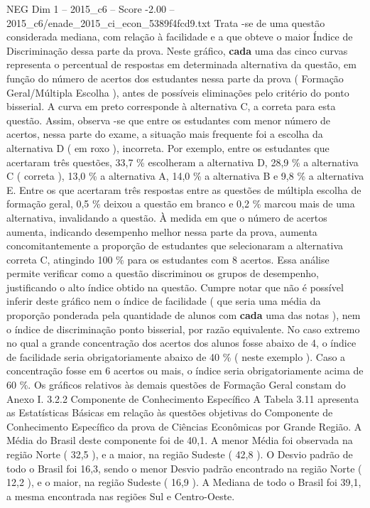 \begin{textsample}{NEG Dim 1 – 2015\_c6 – Score -2.00 – 2015\_c6/enade\_2015\_ci\_econ\_5389f4fcd9.txt}
Trata -se de uma questão considerada mediana, com relação à facilidade e a que obteve o maior Índice de Discriminação dessa parte da prova.
Neste gráfico, \textbf{cada} uma das cinco curvas representa o percentual de respostas em determinada alternativa da questão, em função do número de acertos dos estudantes nessa parte da prova ( Formação Geral/Múltipla Escolha ), antes de possíveis eliminações pelo critério do ponto bisserial.
A curva em preto corresponde à alternativa C, a correta para esta questão.
Assim, observa -se que entre os estudantes com menor número de acertos, nessa parte do exame, a situação mais frequente foi a escolha da alternativa D ( em roxo ), incorreta.
Por exemplo, entre os estudantes que acertaram três questões, 33,7 \% escolheram a alternativa D, 28,9 \% a alternativa C ( correta ), 13,0 \% a alternativa A, 14,0 \% a alternativa B e 9,8 \% a alternativa E.
Entre os que acertaram três respostas entre as questões de múltipla escolha de formação geral, 0,5 \% deixou a questão em branco e 0,2 \% marcou mais de uma alternativa, invalidando a questão.
À medida em que o número de acertos aumenta, indicando desempenho melhor nessa parte da prova, aumenta concomitantemente a proporção de estudantes que selecionaram a alternativa correta C, atingindo 100 \% para os estudantes com 8 acertos.
Essa análise permite verificar como a questão discriminou os grupos de desempenho, justificando o alto índice obtido na questão.
Cumpre notar que não é possível inferir deste gráfico nem o índice de facilidade ( que seria uma média da proporção ponderada pela quantidade de alunos com \textbf{cada} uma das notas ), nem o índice de discriminação ponto bisserial, por razão equivalente.
No caso extremo no qual a grande concentração dos acertos dos alunos fosse abaixo de 4, o índice de facilidade seria obrigatoriamente abaixo de 40 \% ( neste exemplo ).
Caso a concentração fosse em 6 acertos ou mais, o índice seria obrigatoriamente acima de 60 \%.
Os gráficos relativos às demais questões de Formação Geral constam do Anexo I. 3.2.2 Componente de Conhecimento Específico A Tabela 3.11 apresenta as Estatísticas Básicas em relação às questões objetivas do Componente de Conhecimento Específico da prova de Ciências Econômicas por Grande Região.
A Média do Brasil deste componente foi de 40,1.
A menor Média foi observada na região Norte ( 32,5 ), e a maior, na região Sudeste ( 42,8 ).
O Desvio padrão de todo o Brasil foi 16,3, sendo o menor Desvio padrão encontrado na região Norte ( 12,2 ), e o maior, na região Sudeste ( 16,9 ).
A Mediana de todo o Brasil foi 39,1, a mesma encontrada nas regiões Sul e Centro-Oeste.

\end{textsample}

